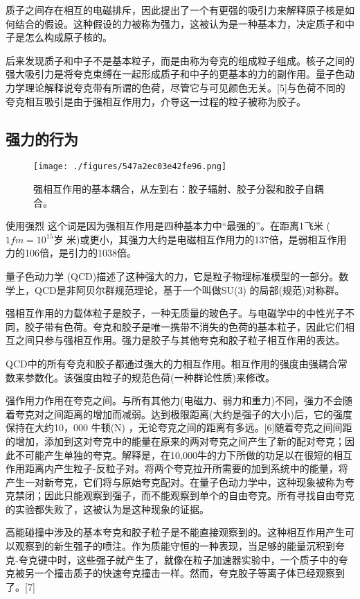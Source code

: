 质子之间存在相互的电磁排斥，因此提出了一个有更强的吸引力来解释原子核是如何结合的假设。这种假设的力被称为强力，这被认为是一种基本力，决定质子和中子是怎么构成原子核的。

后来发现质子和中子不是基本粒子，而是由称为夸克的组成粒子组成。核子之间的强大吸引力是将夸克束缚在一起形成质子和中子的更基本的力的副作用。量子色动力学理论解释说夸克带有所谓的色荷，尽管它与可见颜色无关。[5]与色荷不同的夸克相互吸引是由于强相互作用力，介导这一过程的粒子被称为胶子。

\subsection{强力的行为}
\begin{figure}[ht]
\centering
\texttt{[image: ./figures/547a2ec03e42fe96.png]}
\caption{强相互作用的基本耦合，从左到右：胶子辐射、胶子分裂和胶子自耦合。} \label{fig_QXHZY_1}
\end{figure}
使用强烈 这个词是因为强相互作用是四种基本力中“最强的”。在距离1飞米 ($1  fm = 10^{15}\text{岁}$ 米)或更小，其强力大约是电磁相互作用力的137倍，是弱相互作用力的106倍，是引力的1038倍。

量子色动力学 (QCD)描述了这种强大的力，它是粒子物理标准模型的一部分。数学上，QCD是非阿贝尔群规范理论，基于一个叫做SU(3) 的局部(规范)对称群。

强相互作用的力载体粒子是胶子，一种无质量的玻色子。与电磁学中的中性光子不同，胶子带有色荷。夸克和胶子是唯一携带不消失的色荷的基本粒子，因此它们相互之间只参与强相互作用。强力是胶子与其他夸克和胶子粒子相互作用的表达。

QCD中的所有夸克和胶子都通过强大的力相互作用。相互作用的强度由强耦合常数来参数化。该强度由粒子的规范色荷(一种群论性质)来修改。

强作用力作用在夸克之间。与所有其他力(电磁力、弱力和重力)不同，强力不会随着夸克对之间距离的增加而减弱。达到极限距离(大约是强子的大小)后，它的强度保持在大约10，000 牛顿(N) ，无论夸克之间的距离有多远。[6]随着夸克之间间距的增加，添加到这对夸克中的能量在原来的两对夸克之间产生了新的配对夸克；因此不可能产生单独的夸克。解释是，在10,000牛的力下所做的功足以在很短的相互作用距离内产生粒子-反粒子对。将两个夸克拉开所需要的加到系统中的能量，将产生一对新夸克，它们将与原始夸克配对。在量子色动力学中，这种现象被称为夸克禁闭；因此只能观察到强子，而不能观察到单个的自由夸克。所有寻找自由夸克的实验都失败了，这被认为是这种现象的证据。

高能碰撞中涉及的基本夸克和胶子粒子是不能直接观察到的。这种相互作用产生可以观察到的新生强子的喷注。作为质能守恒的一种表现，当足够的能量沉积到夸克-夸克键中时，这些强子就产生了，就像在粒子加速器实验中，一个质子中的夸克被另一个撞击质子的快速夸克撞击一样。然而，夸克胶子等离子体已经观察到了。[7]

